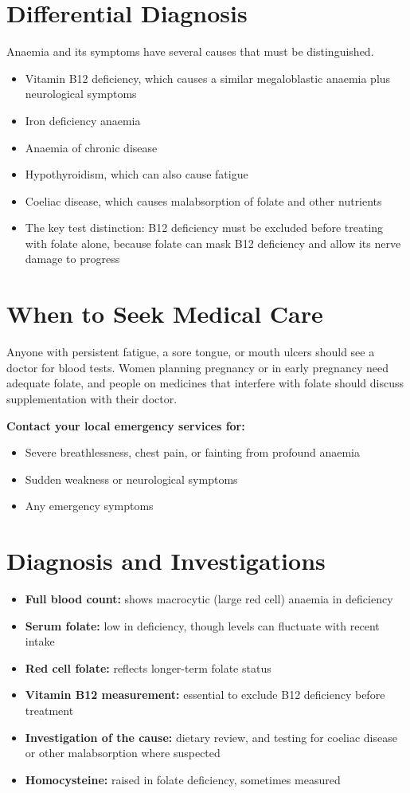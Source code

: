 \section*{Differential Diagnosis}
Anaemia and its symptoms have several causes that must be distinguished.
\begin{itemize}
    \item Vitamin B12 deficiency, which causes a similar megaloblastic anaemia plus neurological symptoms
    \item Iron deficiency anaemia
    \item Anaemia of chronic disease
    \item Hypothyroidism, which can also cause fatigue
    \item Coeliac disease, which causes malabsorption of folate and other nutrients
    \item The key test distinction: B12 deficiency must be excluded before treating with folate alone, because folate can mask B12 deficiency and allow its nerve damage to progress
\end{itemize}

\section*{When to Seek Medical Care}
Anyone with persistent fatigue, a sore tongue, or mouth ulcers should see a doctor for blood tests. Women planning pregnancy or in early pregnancy need adequate folate, and people on medicines that interfere with folate should discuss supplementation with their doctor.

\textbf{Contact your local emergency services for:}
\begin{itemize}
    \item Severe breathlessness, chest pain, or fainting from profound anaemia
    \item Sudden weakness or neurological symptoms
    \item Any emergency symptoms
\end{itemize}

\section*{Diagnosis and Investigations}
\begin{itemize}
    \item \textbf{Full blood count:} shows macrocytic (large red cell) anaemia in deficiency
    \item \textbf{Serum folate:} low in deficiency, though levels can fluctuate with recent intake
    \item \textbf{Red cell folate:} reflects longer-term folate status
    \item \textbf{Vitamin B12 measurement:} essential to exclude B12 deficiency before treatment
    \item \textbf{Investigation of the cause:} dietary review, and testing for coeliac disease or other malabsorption where suspected
    \item \textbf{Homocysteine:} raised in folate deficiency, sometimes measured
\end{itemize}

